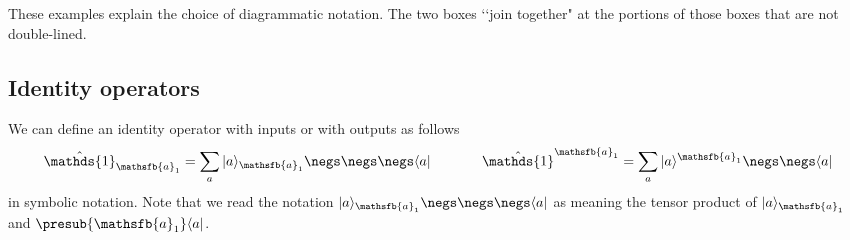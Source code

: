 \documentclass[10pt]{article}
\begin{document}
These examples explain the choice of diagrammatic notation. The two boxes \lq\lq join together" at the portions of those boxes that are not double-lined.

\subsection{Identity operators}\label{sec:identityoperators}

We can define an identity operator with inputs or with outputs as follows
\begin{equation}
\hat{\mathds{1}}_{\mathsfb{a}_1} = \sum_{a} |a\rangle_{\mathsfb{a}_1} \negs\negs\negs\langle a|  ~~~~~~~~~~~
\hat{\mathds{1}}^{\mathsfb{a}_1} = \sum_{a} |a\rangle^{\mathsfb{a}_1} \negs\negs \langle a|
\end{equation}
in symbolic notation.  Note that we read the notation $|a\rangle_{\mathsfb{a}_1}\negs\negs\negs \langle a|$ as meaning the tensor product of $|a\rangle_{\mathsfb{a}_1}$ and $\presub{\mathsfb{a}_1}\langle a|$.
\end{document}
